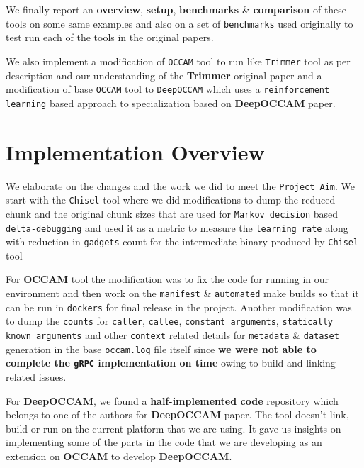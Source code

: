 \documentclass{relatorio}
\begin{document}
We finally report an \textbf{overview}, \textbf{setup}, \textbf{benchmarks} \& \textbf{comparison} of these tools on some same 
examples and also on a set of \texttt{benchmarks} used originally to test run each of the tools in the original papers. 

We also implement a modification of \texttt{OCCAM} tool to run like \texttt{Trimmer} tool as per description and our understanding 
of the \textbf{Trimmer} original paper and a modification of base \texttt{OCCAM} tool to \texttt{DeepOCCAM} which uses a 
\texttt{reinforcement learning} based approach to specialization based on \textbf{DeepOCCAM} paper. 

\section{Implementation Overview}%
\label{Tools}

We elaborate on the changes and the work we did to meet the \texttt{Project Aim}. We start with the \texttt{Chisel} tool where we did modifications to dump the reduced chunk and the original chunk sizes that are used for \texttt{Markov decision} based \texttt{delta-debugging} and used it as a metric to measure the \texttt{learning rate} along with reduction in \texttt{gadgets} count for the intermediate binary produced by \texttt{Chisel} tool

For \textbf{OCCAM} tool the modification was to fix the code for running in our environment and then work on the \texttt{manifest} \& \texttt{automated} make builds so that it can be run in \texttt{dockers} for final release in the project. Another modification was to dump the \texttt{counts} for \texttt{caller}, \texttt{callee}, \texttt{constant arguments}, \texttt{statically known arguments} and other \texttt{context} related details for 
\texttt{metadata} \& \texttt{dataset} generation in the base \texttt{occam.log} file itself since \textbf{we were not able to complete the \texttt{gRPC} implementation on time} owing to build and linking related issues. 

For \textbf{DeepOCCAM}, we found a \textbf{\href{https://github.com/nhamlv-55/OCCAM/tree/mlpolicy}{half-implemented code}} repository which belongs to one of the authors for \textbf{DeepOCCAM} paper. The tool doesn't link, build or run on the current platform that we are using. It gave us insights on implementing some of the parts in the code that we are developing as an extension on \textbf{OCCAM} to develop \textbf{DeepOCCAM}.
\end{document}
